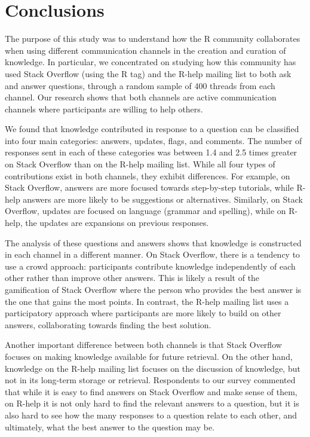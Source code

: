 \documentclass[smallextended]{svjour3}       %
\newcommand{\SO}{Stack Overflow\xspace}
\newcommand{\RH}{R-help\xspace}
\begin{document}
 \section{Conclusions}
\label{cha:conclusion}

The purpose of this study was to understand how the R community collaborates when using different communication channels in the creation and curation of knowledge.
In particular, we concentrated on studying how this community has used Stack Overflow (using the R tag) and the \RH mailing list to both ask and answer questions, through a random sample of 400 threads from each channel. Our research shows that both channels are active communication channels where participants are willing to help others. 

We found that knowledge contributed in response to a question can be classified into four main categories: answers, updates, flags, and comments. The number of
responses sent in each of these categories was between 1.4 and 2.5 times greater on \SO than on the \RH mailing list. While all four types of contributions exist in both
channels, they exhibit differences. For example, on \SO, answers are more focused towards step-by-step tutorials, while \RH answers are more
likely to be suggestions or alternatives. Similarly, on \SO, updates are focused on language (grammar and spelling), while on \RH, the updates are
expansions on previous responses.

The analysis of these questions and answers shows that knowledge is constructed in each channel in a different manner. On \SO, there is a tendency to use
a crowd approach: participants contribute knowledge independently of each other rather than improve other answers. This is likely a result of the
gamification of \SO where the person who provides the best answer is the one that gains the most points.
In contrast, the \RH mailing list uses a participatory approach where participants are more likely to build on other answers, collaborating towards finding the best solution.

Another important difference between both channels is that \SO focuses on making knowledge available for future retrieval. On the other hand, knowledge on the \RH mailing list 
focuses on the discussion of knowledge, but not in its long-term storage or retrieval. Respondents to our survey commented that while it is easy to find answers on \SO
and make sense of them, on \RH it is not only hard to find the relevant answers to a question, but it is also hard to see how the many responses to a question
relate to each other, and ultimately, what the best answer to the question may be.
\end{document}
